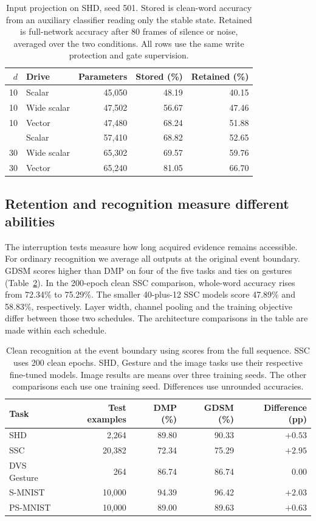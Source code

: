 \documentclass[10pt,twocolumn]{article}
\begin{document}
\begin{table}[htbp]
\centering\small
\caption{Input projection on SHD, seed 501. Stored is clean-word accuracy from an auxiliary classifier reading only the stable state. Retained is full-network accuracy after 80 frames of silence or noise, averaged over the two conditions. All rows use the same write protection and gate supervision.}
\label{tab:capacity}
\begin{tabular}{rlrrr}
\toprule $d$ & Drive & Parameters & Stored (\%) & Retained (\%)\\\midrule
10 & Scalar & 45,050 & 48.19 & 40.15\\
10 & Wide scalar & 47,502 & 56.67 & 47.46\\
10 & Vector & 47,480 & 68.24 & 51.88\\\addlinespace
30 & Scalar & 57,410 & 68.82 & 52.65\\
30 & Wide scalar & 65,302 & 69.57 & 59.76\\
30 & Vector & 65,240 & 81.05 & 66.70\\
\bottomrule
\end{tabular}
\end{table}

\subsection{Retention and recognition measure different abilities}
The interruption tests measure how long acquired evidence remains accessible. For ordinary recognition we average all outputs at the original event boundary. GDSM scores higher than DMP on four of the five tasks and ties on gestures (Table~\ref{tab:recognition}). In the 200-epoch clean SSC comparison, whole-word accuracy rises from 72.34\% to 75.29\%. The smaller 40-plus-12 SSC models score 47.89\% and 58.83\%, respectively. Layer width, channel pooling and the training objective differ between those two schedules. The architecture comparisons in the table are made within each schedule.

\begin{table}[htbp]
\centering\small
\caption{Clean recognition at the event boundary using scores from the full sequence. SSC uses 200 clean epochs. SHD, Gesture and the image tasks use their respective fine-tuned models. Image results are means over three training seeds. The other comparisons each use one training seed. Differences use unrounded accuracies.}
\label{tab:recognition}
\begin{tabular}{lrrrr}
\toprule
Task & Test examples & DMP (\%) & GDSM (\%) & Difference (pp)\\\midrule
SHD & 2,264 & 89.80 & 90.33 & $+0.53$\\
SSC & 20,382 & 72.34 & 75.29 & $+2.95$\\
DVS Gesture & 264 & 86.74 & 86.74 & $0.00$\\
S-MNIST & 10,000 & 94.39 & 96.42 & $+2.03$\\
PS-MNIST & 10,000 & 89.00 & 89.63 & $+0.63$\\
\bottomrule
\end{tabular}
\end{table}
\end{document}
